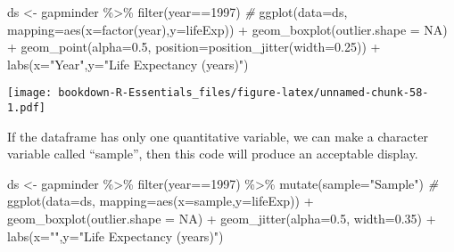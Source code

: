 \documentclass[
]{book}
\newenvironment{Shaded}{\begin{snugshade}}{\end{snugshade}}
\newcommand{\AttributeTok}[1]{\textcolor[rgb]{0.77,0.63,0.00}{#1}}
\newcommand{\CommentTok}[1]{\textcolor[rgb]{0.56,0.35,0.01}{\textit{#1}}}
\newcommand{\ConstantTok}[1]{\textcolor[rgb]{0.00,0.00,0.00}{#1}}
\newcommand{\DecValTok}[1]{\textcolor[rgb]{0.00,0.00,0.81}{#1}}
\newcommand{\FloatTok}[1]{\textcolor[rgb]{0.00,0.00,0.81}{#1}}
\newcommand{\FunctionTok}[1]{\textcolor[rgb]{0.00,0.00,0.00}{#1}}
\newcommand{\NormalTok}[1]{#1}
\newcommand{\OtherTok}[1]{\textcolor[rgb]{0.56,0.35,0.01}{#1}}
\newcommand{\SpecialCharTok}[1]{\textcolor[rgb]{0.00,0.00,0.00}{#1}}
\newcommand{\StringTok}[1]{\textcolor[rgb]{0.31,0.60,0.02}{#1}}
\begin{document}
\begin{Shaded}
\begin{Highlighting}[]
\NormalTok{ds }\OtherTok{\textless{}{-}}\NormalTok{ gapminder }\SpecialCharTok{\%\textgreater{}\%} \FunctionTok{filter}\NormalTok{(year}\SpecialCharTok{==}\DecValTok{1997}\NormalTok{) }
\CommentTok{\#}
\FunctionTok{ggplot}\NormalTok{(}\AttributeTok{data=}\NormalTok{ds, }\AttributeTok{mapping=}\FunctionTok{aes}\NormalTok{(}\AttributeTok{x=}\FunctionTok{factor}\NormalTok{(year),}\AttributeTok{y=}\NormalTok{lifeExp)) }\SpecialCharTok{+}
 \FunctionTok{geom\_boxplot}\NormalTok{(}\AttributeTok{outlier.shape =} \ConstantTok{NA}\NormalTok{) }\SpecialCharTok{+} 
 \FunctionTok{geom\_point}\NormalTok{(}\AttributeTok{alpha=}\FloatTok{0.5}\NormalTok{, }\AttributeTok{position=}\FunctionTok{position\_jitter}\NormalTok{(}\AttributeTok{width=}\FloatTok{0.25}\NormalTok{)) }\SpecialCharTok{+}
  \FunctionTok{labs}\NormalTok{(}\AttributeTok{x=}\StringTok{"Year"}\NormalTok{,}\AttributeTok{y=}\StringTok{"Life Expectancy (years)"}\NormalTok{)}
\end{Highlighting}
\end{Shaded}

\texttt{[image: bookdown-R-Essentials\_files/figure-latex/unnamed-chunk-58-1.pdf]}

If the dataframe has only one quantitative variable, we can make a character variable called ``sample'', then this code will produce an acceptable display.

\begin{Shaded}
\begin{Highlighting}[]
\NormalTok{ds }\OtherTok{\textless{}{-}}\NormalTok{ gapminder }\SpecialCharTok{\%\textgreater{}\%} \FunctionTok{filter}\NormalTok{(year}\SpecialCharTok{==}\DecValTok{1997}\NormalTok{) }\SpecialCharTok{\%\textgreater{}\%}
  \FunctionTok{mutate}\NormalTok{(}\AttributeTok{sample=}\StringTok{"Sample"}\NormalTok{)}
\CommentTok{\#}
\FunctionTok{ggplot}\NormalTok{(}\AttributeTok{data=}\NormalTok{ds, }\AttributeTok{mapping=}\FunctionTok{aes}\NormalTok{(}\AttributeTok{x=}\NormalTok{sample,}\AttributeTok{y=}\NormalTok{lifeExp)) }\SpecialCharTok{+}
 \FunctionTok{geom\_boxplot}\NormalTok{(}\AttributeTok{outlier.shape =} \ConstantTok{NA}\NormalTok{) }\SpecialCharTok{+} 
 \FunctionTok{geom\_jitter}\NormalTok{(}\AttributeTok{alpha=}\FloatTok{0.5}\NormalTok{, }\AttributeTok{width=}\FloatTok{0.35}\NormalTok{) }\SpecialCharTok{+}
  \FunctionTok{labs}\NormalTok{(}\AttributeTok{x=}\StringTok{""}\NormalTok{,}\AttributeTok{y=}\StringTok{"Life Expectancy (years)"}\NormalTok{)}
\end{Highlighting}
\end{Shaded}
\end{document}
